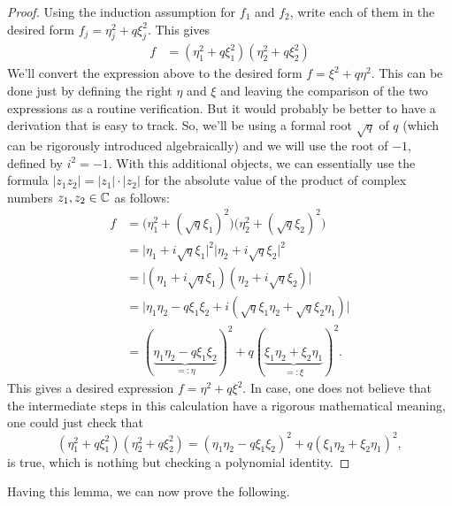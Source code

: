 \begin{proof}
	Using the induction assumption for $f_1$ and $f_2$, write each of them in the desired form $f_j = \eta_j^2 + q \xi_j^2$. This gives 
	\begin{align*}
		f & = (\eta_1^2 + q \xi_1^2) (\eta_2^2 + q \xi_2^2) 
	\end{align*}
	We'll convert the expression above to the desired form $ f= \xi^2 + q \eta^2$. This can be done just by defining the right $\eta$ and $\xi$ and leaving the comparison of the two expressions as a routine verification. But it would probably be better to have a derivation that is easy to track. So, we'll be using a formal root $\sqrt{q}$ of $q$ (which can be rigorously introduced algebraically) and we will use the root of $-1$, defined by $i^2 = -1$. With this additional objects, we can essentially use the formula $|z_1 z_2| = |z_1| \cdot |z_2|$ for the absolute value of the product of complex numbers $z_1, z_2 \in \mathbb{C}$ as follows: 
	\begin{align*}
		f & = \bigl(\eta_1^2 + ( \sqrt{q} \xi_1)^2 \bigr) \bigl(\eta_2^2 + (\sqrt{q} \xi_2)^2 \bigr) 
		 \\ & = \bigl | \eta_1 + i \sqrt{q} \xi_1 \bigr|^2 \bigl| \eta_2 + i \sqrt{q} \xi_2 \bigr|^2
		 \\ & = \bigl | (\eta_1 + i \sqrt{q} \xi_1) (\eta_2 + i \sqrt{q} \xi_2) \bigr|
		 \\ & = \bigl| \eta_1 \eta_2 - q \xi_1 \xi_2 + i (\sqrt{q} \xi_1 \eta_2 + \sqrt{q} \xi_2 \eta_1 ) \bigr|
		 \\ & = (\underbrace{\eta_1 \eta_2 - q \xi_1 \xi_2}_{=:\eta})^2 + q ( \underbrace{\xi_1 \eta_2 + \xi_2 \eta_1}_{=:\xi})^2.
	\end{align*}
	This gives a desired expression $ f= \eta^2 + q \xi^2$. In case, one does not believe that the intermediate steps in this calculation have a rigorous mathematical meaning, one could just check that 
	\[
		(\eta_1^2 + q \xi_1^2) (\eta_2^2 + q \xi_2^2) = (\eta_1 \eta_2 - q \xi_1 \xi_2)^2 + q (\xi_1 \eta_2 + \xi_2 \eta_1)^2,
	\]
	is true, which is nothing but checking a polynomial identity. 
\end{proof}

Having this lemma, we can now prove the following. 

